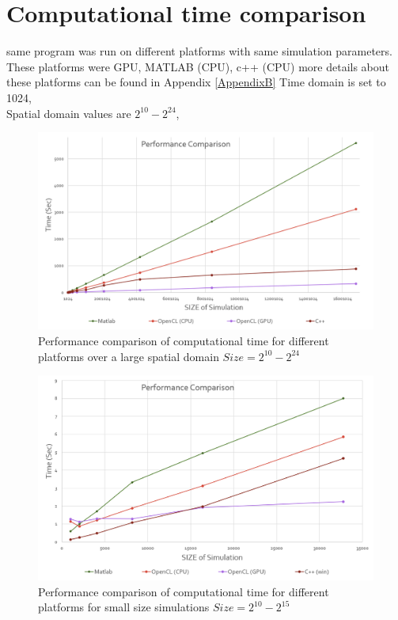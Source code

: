 \section{Computational time comparison}
same program was run on different platforms with same simulation parameters. These platforms were GPU, MATLAB (CPU), c++ (CPU) more details about these platforms can be found in Appendix \ref{AppendixB}
Time domain is set to 1024,\\
Spatial domain values are $2^{10} - 2^{24}$,\\
\begin{figure}[htbp]
	\centering
		\includegraphics[width=6in]{Figures/g1.png}
	\caption[Computational Time on different platforms]{Performance comparison of computational time for different platforms over a large spatial domain $ Size = 2^{10} - 2^{24}$ }
	\label{g1}
\end{figure}
\begin{figure}[htbp]
	\centering
		\includegraphics[width=6in]{Figures/g2.png}
	\caption[Computational Time on different platforms 2]{Performance comparison of computational time for different platforms for small size simulations $ Size = 2^{10} - 2^{15}$}
	\label{g2}
\end{figure}
